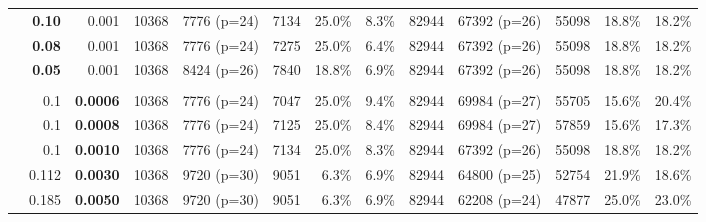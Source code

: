 \begin{table*}
\begin{tabular}{l|rr|rrrrr|rrrrr}
    & \textbf{0.10} & 0.001  & 10368 & 7776 (p=24) & 7134 & 25.0\% & 8.3\% & 82944 & 67392 (p=26) & 55098 & 18.8\% & 18.2\% \\
    
    & \textbf{0.08} & 0.001  & 10368 & 7776 (p=24) & 7275 & 25.0\% & 6.4\% & 82944 & 67392 (p=26) & 55098 & 18.8\% & 18.2\% \\
    
    & \textbf{0.05} & 0.001  & 10368 & 8424 (p=26) & 7840 & 18.8\% & 6.9\% & 82944 & 67392 (p=26) & 55098 & 18.8\% & 18.2\% \\
    
    & & & & & & & & & & & &\\
    
    & 0.1 & \textbf{0.0006}  & 10368 & 7776 (p=24) & 7047 & 25.0\% & 9.4\% & 82944 & 69984 (p=27) & 55705 & 15.6\% & 20.4\% \\
    
    & 0.1 & \textbf{0.0008}  & 10368 & 7776 (p=24) & 7125 & 25.0\% & 8.4\% & 82944 & 69984 (p=27) & 57859 & 15.6\% & 17.3\% \\
    
    & 0.1 & \textbf{0.0010}  & 10368 & 7776 (p=24) & 7134 & 25.0\% & 8.3\% & 82944 & 67392 (p=26) & 55098 & 18.8\% & 18.2\% \\
    
    & 0.112 & \textbf{0.0030}  & 10368 &  9720 (p=30) & 9051 & 6.3\% & 6.9\% & 82944 & 64800 (p=25) & 52754 & 21.9\% & 18.6\% \\
    
    & 0.185 &\textbf{0.0050}  & 10368 & 9720 (p=30) & 9051 & 6.3\% & 6.9\% & 82944 & 62208 (p=24) & 47877 & 25.0\%& 23.0\% \\
    \bottomrule
  \end{tabular}
\end{table*}